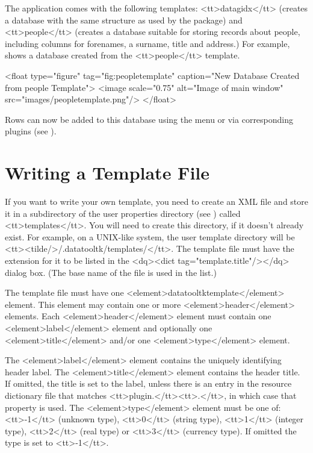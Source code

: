    The  application comes with the following templates: 
   <tt>datagidx</tt> (creates a database with the same structure as
   used by the  package) and <tt>people</tt> (creates
   a database suitable for storing records about people, including
   columns for forenames, a surname, title and address.) For example,
    shows a database created from the 
   <tt>people</tt> template.

   <float type="figure" tag="fig:peopletemplate" 
      caption="New Database Created from people Template">
     <image scale="0.75" alt="Image of main window"
        src="images/peopletemplate.png"/>
   </float>

   Rows can now be added to this database using the 
   menu or via corresponding plugins (see ).


\section{Writing a Template File}\label{sec:writingtemplates}

   If you want to write your own template, you need to create an XML file
   and store it in a subdirectory  of the  
   user properties directory (see ) called 
   <tt>templates</tt>. You will need to create this directory, if it doesn't
   already exist. For example, on a UNIX-like system, the user
   template directory will be <tt><tilde/>/.datatooltk/templates/</tt>.
   The template file must have the extension  for it to be
   listed in the <dq><dict tag="template.title"/></dq> dialog box. (The base
   name of the file is used in the list.)


   The template file must have one <element>datatooltktemplate</element> element. This
   element may contain one or more <element>header</element> elements. Each 
   <element>header</element> element must contain one <element>label</element> element and 
   optionally one <element>title</element> and/or one <element>type</element> element.


   The <element>label</element> element contains the uniquely identifying header label.
   The <element>title</element> element contains the header title. If omitted, the
   title is set to the label, unless there is an entry in the resource
   dictionary file that matches <tt>plugin.</tt><tt>.</tt>, 
   in which case that property is used. The <element>type</element> element must be one of:
   <tt>-1</tt> (unknown type), <tt>0</tt> (string type), <tt>1</tt> (integer 
   type), <tt>2</tt> (real type) or <tt>3</tt> (currency type). If omitted the 
   type is set to <tt>-1</tt>.


